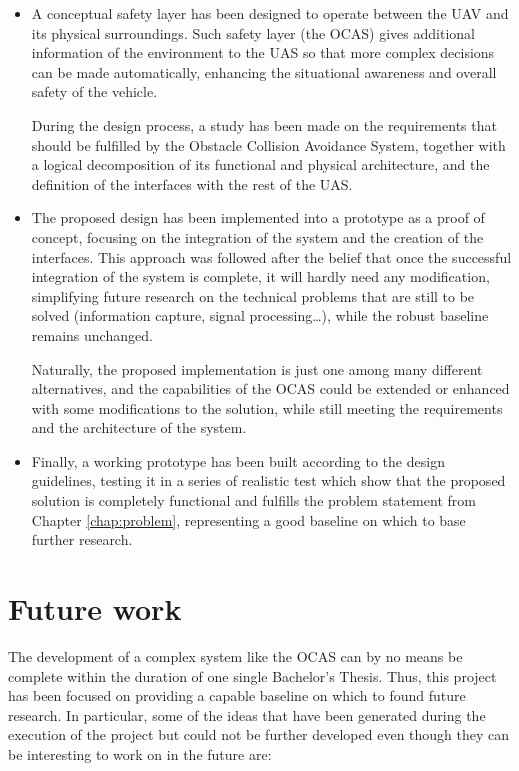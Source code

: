 \begin{itemize}

	\item A conceptual safety layer has been designed to operate between the UAV and its physical surroundings.
		Such safety layer (the OCAS) gives additional information of the environment to the UAS so that more complex decisions can be made automatically, enhancing the situational awareness and overall safety of the vehicle.

		During the design process, a study has been made on the requirements that should be fulfilled by the Obstacle Collision Avoidance System, together with a logical decomposition of its functional and physical architecture, and the definition of the interfaces with the rest of the UAS.

	\item The proposed design has been implemented into a prototype as a proof of concept, focusing on the integration of the system and the creation of the interfaces.
		This approach was followed after the belief that once the successful integration of the system is complete, it will hardly need any modification, simplifying future research on the technical problems that are still to be solved (information capture, signal processing\ldots), while the robust baseline remains unchanged.

		Naturally, the proposed implementation is just one among many different alternatives, and the capabilities of the OCAS could be extended or enhanced with some modifications to the solution, while still meeting the requirements and the architecture of the system.

	\item Finally, a working prototype has been built according to the design guidelines, testing it in a series of realistic test which show that the proposed solution is completely functional and fulfills the problem statement from Chapter \ref{chap:problem}, representing a good baseline on which to base further research.

\end{itemize}

\section{Future work}

The development of a complex system like the OCAS can by no means be complete within the duration of one single Bachelor's Thesis.
Thus, this project has been focused on providing a capable baseline on which to found future research.
In particular, some of the ideas that have been generated during the execution of the project but could not be further developed even though they can be interesting to work on in the future are:

